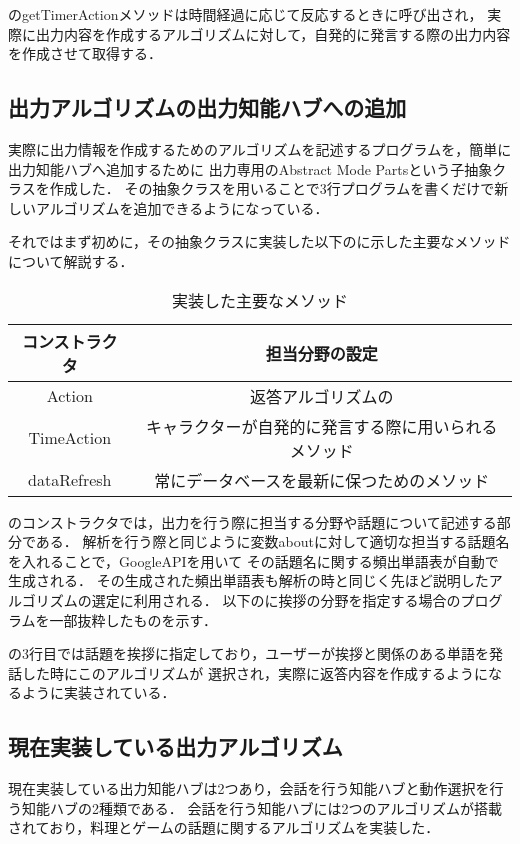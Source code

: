 のgetTimerActionメソッドは時間経過に応じて反応するときに呼び出され，
実際に出力内容を作成するアルゴリズムに対して，自発的に発言する際の出力内容を作成させて取得する．

\subsection{出力アルゴリズムの出力知能ハブへの追加}
実際に出力情報を作成するためのアルゴリズムを記述するプログラムを，簡単に出力知能ハブへ追加するために
出力専用のAbstract Mode Partsという子抽象クラスを作成した．
その抽象クラスを用いることで3行プログラムを書くだけで新しいアルゴリズムを追加できるようになっている．

それではまず初めに，その抽象クラスに実装した以下のに示した主要なメソッドについて解説する．

\begin{table}[tbh]
	\caption{実装した主要なメソッド} \label{tab:parts}
	\begin{center}
		\begin{tabular}[htb]{c|c}
		\hline
		コンストラクタ & 担当分野の設定 \\
		\hline
		Action & 返答アルゴリズムの \\
		\hline
		TimeAction & キャラクターが自発的に発言する際に用いられるメソッド \\
		\hline
		dataRefresh & 常にデータベースを最新に保つためのメソッド \\
		\hline
		\end{tabular}
	\end{center}
\end{table}

のコンストラクタでは，出力を行う際に担当する分野や話題について記述する部分である．
解析を行う際と同じように変数aboutに対して適切な担当する話題名を入れることで，GoogleAPIを用いて
その話題名に関する頻出単語表が自動で生成される．
その生成された頻出単語表も解析の時と同じく先ほど説明したアルゴリズムの選定に利用される．
以下のに挨拶の分野を指定する場合のプログラムを一部抜粋したものを示す．


の3行目では話題を挨拶に指定しており，ユーザーが挨拶と関係のある単語を発話した時にこのアルゴリズムが
選択され，実際に返答内容を作成するようになるように実装されている．

\subsection{現在実装している出力アルゴリズム}\label{sec:back}
現在実装している出力知能ハブは2つあり，会話を行う知能ハブと動作選択を行う知能ハブの2種類である．
会話を行う知能ハブには2つのアルゴリズムが搭載されており，料理とゲームの話題に関するアルゴリズムを実装した．

